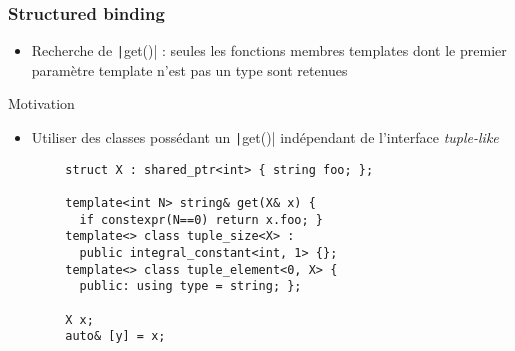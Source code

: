 \documentclass[C++.tex]{subfiles}
\begin{document}
\begin{frame}[fragile]
	\frametitle{Structured binding}
	\begin{itemize}
		\item Recherche de \texttt|get()| : seules les fonctions membres templates dont le premier paramètre template n'est pas un type sont retenues
	\end{itemize}

	\begin{block}{Motivation}
		\begin{itemize}
			\item Utiliser des classes possédant un \texttt|get()| indépendant de l'interface \textit{tuple-like}
		\end{itemize}
	\end{block}

	\begin{verbatim}
		struct X : shared_ptr<int> { string foo; };

		template<int N> string& get(X& x) {
		  if constexpr(N==0) return x.foo; }
		template<> class tuple_size<X> :
		  public integral_constant<int, 1> {};
		template<> class tuple_element<0, X> {
		  public: using type = string; };

		X x;
		auto& [y] = x;
	\end{verbatim}


\end{frame}
\end{document}
